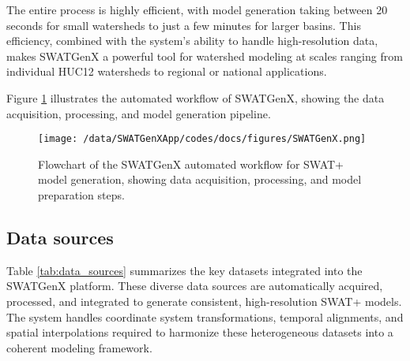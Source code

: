 \documentclass[final,3p,times]{elsarticle}
\begin{document}
The entire process is highly efficient, with model generation taking between 20 seconds for small watersheds to just a few minutes for larger basins. This efficiency, combined with the system's ability to handle high-resolution data, makes SWATGenX a powerful tool for watershed modeling at scales ranging from individual HUC12 watersheds to regional or national applications.

Figure \ref{fig:workflow} illustrates the automated workflow of SWATGenX, showing the data acquisition, processing, and model generation pipeline.

\begin{figure}[htbp]
    \centering
    \texttt{[image: /data/SWATGenXApp/codes/docs/figures/SWATGenX.png]}
    \caption{Flowchart of the SWATGenX automated workflow for SWAT+ model generation, showing data acquisition, processing, and model preparation steps.}
    \label{fig:workflow}
\end{figure}

\subsection{Data sources}
\label{subsec:data_sources}

Table \ref{tab:data_sources} summarizes the key datasets integrated into the SWATGenX platform. These diverse data sources are automatically acquired, processed, and integrated to generate consistent, high-resolution SWAT+ models. The system handles coordinate system transformations, temporal alignments, and spatial interpolations required to harmonize these heterogeneous datasets into a coherent modeling framework.
\end{document}
